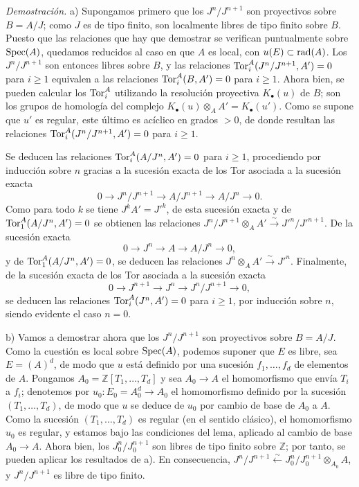 \emph{Demostración.} a) Supongamos primero que los $J^n/J^{n+1}$ son proyectivos sobre $B=A/J$; como $J$ es de tipo finito, son localmente libres de tipo finito sobre $B$. Puesto que las relaciones que hay que demostrar se verifican puntualmente sobre $\operatorname{Spec}(A)$, quedamos reducidos al caso en que $A$ es local, con $u(E)\subset\operatorname{rad}(A)$. Los $J^n/J^{n+1}$ son entonces libres sobre $B$, y las relaciones $\operatorname{Tor}_i^A(J^n/J^{n+1},A')=0$ para $i\geq1$ equivalen a las relaciones $\operatorname{Tor}_i^A(B,A')=0$ para $i\geq1$. Ahora bien, se pueden calcular los $\operatorname{Tor}_i^A$ utilizando la resolución proyectiva $K_\bullet(u)$ de $B$; son los grupos de homología del complejo $K_\bullet(u)\otimes_AA'=K_\bullet(u')$. Como se supone que $u'$ es regular, este último es acíclico en grados $>0$, de donde resultan las relaciones $\operatorname{Tor}_i^A(J^n/J^{n+1},A')=0$ para $i\geq1$.

Se deducen las relaciones $\operatorname{Tor}_i^A(A/J^n,A')=0$ para $i\geq1$, procediendo por inducción sobre $n$ gracias a la sucesión exacta de los Tor asociada a la sucesión exacta
\[
 0\longrightarrow J^n/J^{n+1}\longrightarrow A/J^{n+1}\longrightarrow A/J^n\longrightarrow0.
\]
Como para todo $k$ se tiene $J^kA'=J'^k$, de esta sucesión exacta y de $\operatorname{Tor}_1^A(A/J^n,A')=0$ se obtienen las relaciones $J^n/J^{n+1}\otimes_AA'\xrightarrow{\sim}J'^n/J'^{n+1}$. De la sucesión exacta
\[
 0\longrightarrow J^n\longrightarrow A\longrightarrow A/J^n\longrightarrow0,
\]
y de $\operatorname{Tor}_1^A(A/J^n,A')=0$, se deducen las relaciones $J^n\otimes_AA'\xrightarrow{\sim}J'^n$. Finalmente, de la sucesión exacta de los Tor asociada a la sucesión exacta
\[
 0\longrightarrow J^{n+1}\longrightarrow J^n\longrightarrow J^n/J^{n+1}\longrightarrow0,
\]
se deducen las relaciones $\operatorname{Tor}_i^A(J^n,A')=0$ para $i\geq1$, por inducción sobre $n$, siendo evidente el caso $n=0$.

b) Vamos a demostrar ahora que los $J^n/J^{n+1}$ son proyectivos sobre $B=A/J$. Como la cuestión es local sobre $\operatorname{Spec}(A)$, podemos suponer que $E$ es libre, sea $E=(A)^d$, de modo que $u$ está definido por una sucesión $f_1,\ldots,f_d$ de elementos de $A$. Pongamos $A_0=\mathbb Z[T_1,\ldots,T_d]$ y sea $A_0\longrightarrow A$ el homomorfismo que envía $T_i$ a $f_i$; denotemos por $u_0:E_0=A_0^d\longrightarrow A_0$ el homomorfismo definido por la sucesión $(T_1,\ldots,T_d)$, de modo que $u$ se deduce de $u_0$ por cambio de base de $A_0$ a $A$. Como la sucesión $(T_1,\ldots,T_d)$ es regular (en el sentido clásico), el homomorfismo $u_0$ es regular, y estamos bajo las condiciones del lema, aplicado al cambio de base $A_0\longrightarrow A$. Ahora bien, los $J_0^n/J_0^{n+1}$ son libres de tipo finito sobre $\mathbb Z$; por tanto, se pueden aplicar los resultados de a). En consecuencia, $J^n/J^{n+1}\xleftarrow{\sim}J_0^n/J_0^{n+1}\otimes_{A_0}A$, y $J^n/J^{n+1}$ es libre de tipo finito.

